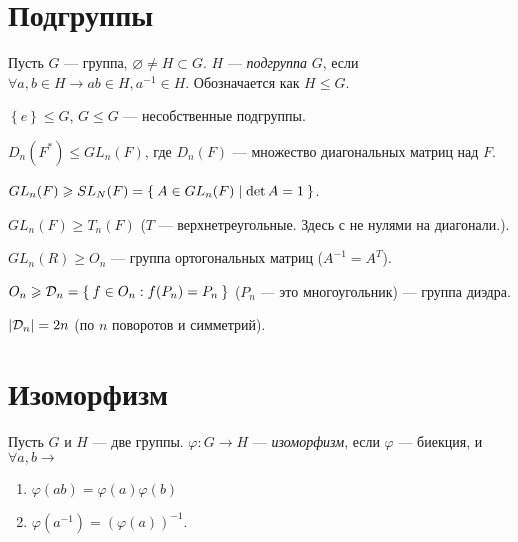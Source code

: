 \section*{Подгруппы}

\begin{define*}
  Пусть $G$ --- группа, $\varnothing \neq H \subset G$. $H$ --- \emph{подгруппа} $G$, если $\forall a, b \in H \to ab \in H, a^{-1} \in H$. 
  Обозначается как $H \le G$.
\end{define*}

\begin{define*}
  $\left\{ e \right\} \le G$, $G \le G$ --- несобственные подгруппы.
\end{define*}

\begin{example}
  $D_n(F^*) \le GL_n(F)$, где $D_n(F)$ --- множество диагональных матриц над $F$.
\end{example}

\begin{example}
  $GL_n(F) \geqslant SL_N(F) = \Set{ A \in GL_n(F) | \det{A} = 1 }$.
\end{example}

\begin{exercise}
  $GL_n(F) \ge T_n(F)$ ($T$ --- верхнетреугольные. Здесь с не нулями на диагонали.).
\end{exercise}

\begin{example}
  $GL_n(R)	\ge O_n$ --- группа ортогональных матриц ($A^{-1} = A^T$).
\end{example}

\begin{example}
  $O_n \geqslant \mathcal{D}_n = \Set{ f \in O_n: f(P_n) = P_n }$ ($P_n$ --- это многоугольник) --- группа диэдра.
\end{example}

\begin{exercise}
  $\left\lvert \mathcal{D}_n \right\rvert = 2n$ (по $n$ поворотов и симметрий).
\end{exercise}

\section*{Изоморфизм}

\begin{define*}
  Пусть $G$ и $H$ --- две группы. $\varphi: G\to H$ --- \emph{изоморфизм}, если $\varphi$ --- биекция, и $\forall a, b \to$
  \begin{enumerate}
	\item $\varphi(ab) = \varphi(a)\varphi(b)$
	\item $\varphi(a^{-1}) = (\varphi(a))^{-1}$.
  \end{enumerate}
\end{define*}

